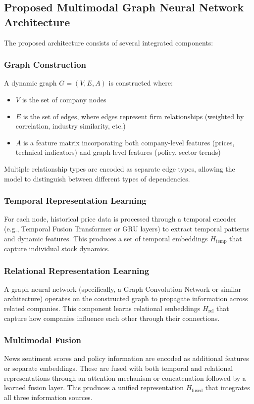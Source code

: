 \subsection{Proposed Multimodal Graph Neural Network Architecture}

The proposed architecture consists of several integrated components:

\subsubsection{Graph Construction}
A dynamic graph $G = (V, E, A)$ is constructed where:
\begin{itemize}
    \item $V$ is the set of company nodes
    \item $E$ is the set of edges, where edges represent firm relationships (weighted by correlation, industry similarity, etc.)
    \item $A$ is a feature matrix incorporating both company-level features (prices, technical indicators) and graph-level features (policy, sector trends)
\end{itemize}

Multiple relationship types are encoded as separate edge types, allowing the model to distinguish between different types of dependencies.

\subsubsection{Temporal Representation Learning}
For each node, historical price data is processed through a temporal encoder (e.g., Temporal Fusion Transformer or GRU layers) to extract temporal patterns and dynamic features. This produces a set of temporal embeddings $H_{\text{temp}}$ that capture individual stock dynamics.

\subsubsection{Relational Representation Learning}
A graph neural network (specifically, a Graph Convolution Network or similar architecture) operates on the constructed graph to propagate information across related companies. This component learns relational embeddings $H_{\text{rel}}$ that capture how companies influence each other through their connections.

\subsubsection{Multimodal Fusion}
News sentiment scores and policy information are encoded as additional features or separate embeddings. These are fused with both temporal and relational representations through an attention mechanism or concatenation followed by a learned fusion layer. This produces a unified representation $H_{\text{fused}}$ that integrates all three information sources.


